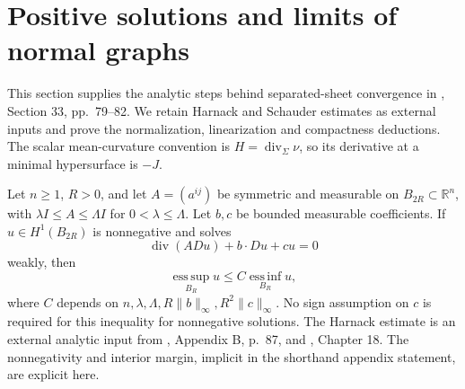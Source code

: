 \chapter{Positive solutions and limits of normal graphs}\label{sec:jacobi-limits}
This section supplies the analytic steps behind separated-sheet convergence in \cite{ChMin}, Section 33, pp.~79--82. We retain Harnack and Schauder estimates as external inputs and prove the normalization, linearization and compactness deductions. The scalar mean-curvature convention is $H=\operatorname{div}_\Sigma\nu$, so its derivative at a minimal hypersurface is $-J$.

\begin{theorem}\label{thm:harnack-lower-order}
Let $n\geq1$, $R>0$, and let $A=(a^{ij})$ be symmetric and measurable on $B_{2R}\subset\mathbb R^n$, with $\lambda I\leq A\leq\Lambda I$ for $0<\lambda\leq\Lambda$. Let $b,c$ be bounded measurable coefficients. If $u\in H^1(B_{2R})$ is nonnegative and solves
\[
 \operatorname{div}(A Du)+b\cdot Du+cu=0
\]
weakly, then
\[
 \operatorname*{ess\,sup}_{B_R}u\leq C\operatorname*{ess\,inf}_{B_R}u,
\]
where $C$ depends on $n,\lambda,\Lambda,R\|b\|_\infty,R^2\|c\|_\infty$. No sign assumption on $c$ is required for this inequality for nonnegative solutions. The Harnack estimate is an external analytic input from \cite{ChMin}, Appendix B, p.~87, and \cite{SimonPDE}, Chapter 18. The nonnegativity and interior margin, implicit in the shorthand appendix statement, are explicit here.
\end{theorem}

